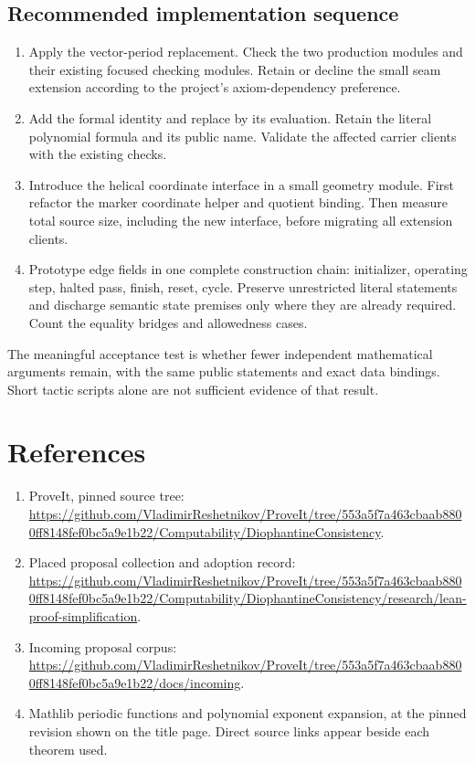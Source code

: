 \documentclass[11pt,letterpaper]{article}
\newcommand{\code}[1]{\texttt{\detokenize{#1}}}
\begin{document}
\subsection{Recommended implementation sequence}

\begin{enumerate}
\item Apply the vector-period replacement. Check the two production modules
and their existing focused checking modules. Retain or decline the small
seam extension according to the project's axiom-dependency preference.
\item Add the formal \code{core_eq} identity and replace \code{value_eq} by
its evaluation. Retain the literal polynomial formula and its public name.
Validate the affected carrier clients with the existing checks.
\item Introduce the helical coordinate interface in a small geometry module.
First refactor the marker coordinate helper and quotient binding. Then
measure total source size, including the new interface, before migrating
all extension clients.
\item Prototype edge fields in one complete construction chain: initializer,
operating step, halted pass, finish, reset, cycle. Preserve unrestricted
literal statements and discharge semantic state premises only where they
are already required. Count the equality bridges and allowedness cases.
\end{enumerate}

The meaningful acceptance test is whether fewer independent mathematical
arguments remain, with the same public statements and exact data bindings.
Short tactic scripts alone are not sufficient evidence of that result.

\section{References}

\begin{enumerate}
\item ProveIt, pinned source tree:
\url{https://github.com/VladimirReshetnikov/ProveIt/tree/553a5f7a463cbaab8800ff8148fef0bc5a9e1b22/Computability/DiophantineConsistency}.
\item Placed proposal collection and adoption record:
\url{https://github.com/VladimirReshetnikov/ProveIt/tree/553a5f7a463cbaab8800ff8148fef0bc5a9e1b22/Computability/DiophantineConsistency/research/lean-proof-simplification}.
\item Incoming proposal corpus:
\url{https://github.com/VladimirReshetnikov/ProveIt/tree/553a5f7a463cbaab8800ff8148fef0bc5a9e1b22/docs/incoming}.
\item Mathlib periodic functions and polynomial exponent expansion, at the pinned revision shown on the title page. Direct source links appear
beside each theorem used.
\end{enumerate}
\end{document}
